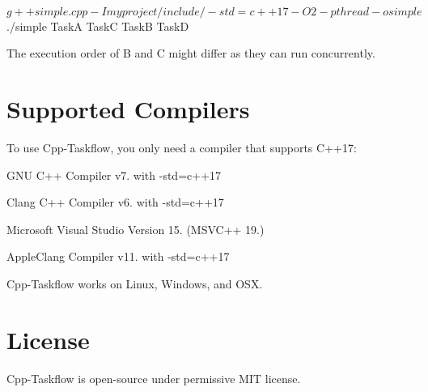 \begin{DoxyCode}
~$ g++ simple.cpp -I myproject/include/ -std=c++17 -O2 -pthread -o simple
~$ ./simple
TaskA
TaskC 
TaskB 
TaskD
\end{DoxyCode}


The execution order of B and C might differ as they can run concurrently.\hypertarget{index_SupportedCompilers}{}\section{Supported Compilers}\label{index_SupportedCompilers}
To use Cpp-\/\+Taskflow, you only need a compiler that supports C++17\+:

\begin{DoxyItemize}
\item G\+NU C++ Compiler v7. with -\/std=c++17 \item Clang C++ Compiler v6. with -\/std=c++17 \item Microsoft Visual Studio Version 15. (M\+S\+V\+C++ 19.) \item Apple\+Clang Compiler v11. with -\/std=c++17\end{DoxyItemize}
Cpp-\/\+Taskflow works on Linux, Windows, and O\+SX.\hypertarget{index_License}{}\section{License}\label{index_License}
Cpp-\/\+Taskflow is open-\/source under permissive M\+IT license. 